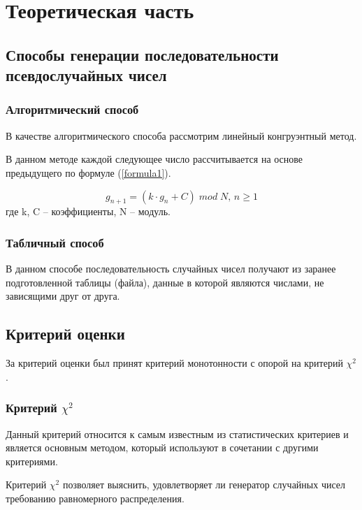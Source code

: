 \chapter{Теоретическая часть}

\section{Способы генерации последовательности псевдослучайных чисел}

\subsection{Алгоритмический способ}

В качестве алгоритмического способа рассмотрим линейный конгруэнтный метод.

В данном методе каждой следующее число рассчитывается на основе предыдущего по формуле (\ref{formula1}).

\begin{equation}\label{formula1}
g_{n + 1} = (k \cdot g_n + C)\;mod\;N,\, n \geq 1
\end{equation}
где k, C -- коэффициенты, N -- модуль.

\subsection{Табличный способ}

В данном способе последовательность случайных чисел получают из заранее подготовленной таблицы (файла), данные в которой являются числами, не зависящими друг от друга.

\section{Критерий оценки}

За критерий оценки был принят критерий монотонности с опорой на критерий $\chi^2$.

\subsection{Критерий $\chi^2$}

Данный критерий относится к самым известным из статистических критериев и является основным методом, который используют в сочетании с другими критериями.

Критерий $\chi^2$ позволяет выяснить, удовлетворяет ли генератор случайных чисел требованию равномерного распределения.

